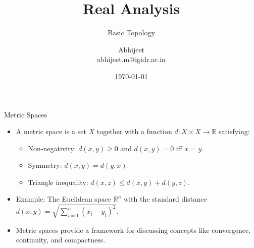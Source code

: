 \documentclass{beamer}
\title[Real Analysis]{Real Analysis}
\subtitle{Basic Topology}
\author[Abhijeet]{Abhijeet \\ \small abhijeet.m@igidr.ac.in}
\institute[IGIDR]{Mathematics for Economists \\  IGIDR}
\date{\today}
\begin{document}
\begin{frame}[plain]
  \titlepage
\end{frame}

\begin{frame}{Metric Spaces}
  \begin{itemize}

    \item A metric space is a set $X$ together with a function $d: X \times X
    \to \mathbb{R}$ satisfying:
    \begin{itemize}
      \item Non-negativity: $d(x,y) \geq 0$ and $d(x,y) = 0$ iff $x = y$.
      \item Symmetry: $d(x,y) = d(y,x)$.
      \item Triangle inequality: $d(x,z) \leq d(x,y) + d(y,z)$.
    \end{itemize}
    \item Example: The Euclidean space $\mathbb{R}^n$ with the standard distance
    $d(x,y) = \sqrt{\sum_{i=1}^n (x_i - y_i)^2}$.
    \item Metric spaces provide a framework for discussing concepts like
    convergence, continuity, and compactness.
  \end{itemize}
\end{frame}
\end{document}

